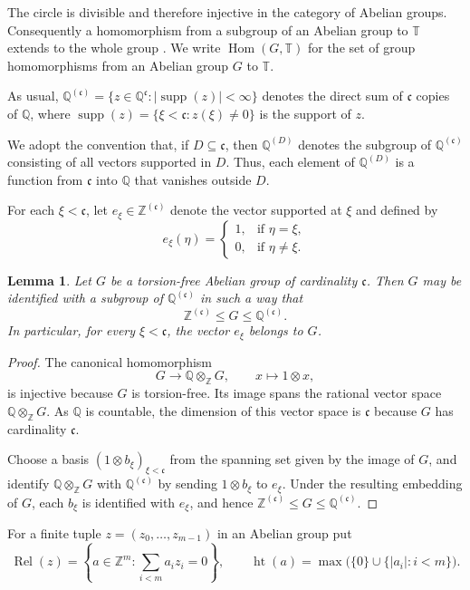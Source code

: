 \documentclass[10pt,a4paper]{amsart}
\newtheorem{lemma}[theorem]{Lemma}
\newcommand{\T}{\mathbb T}
\newcommand{\Z}{\mathbb Z}
\newcommand{\Q}{\mathbb Q}
\newcommand{\cfrak}{\mathfrak c}
\newcommand{\Hom}{\operatorname{Hom}}
\newcommand{\supp}{\operatorname{supp}}
\newcommand{\Rel}{\operatorname{Rel}}
\newcommand{\htop}{\operatorname{ht}}
\begin{document}
The circle is divisible and therefore injective in the category of Abelian
groups.  Consequently a homomorphism from a subgroup of an Abelian group to
$\T$ extends to the whole group
\cite[Theorem~21.1]{Fuchs1970}.
We write $\Hom(G,\T)$ for the set of group homomorphisms from an Abelian
group $G$ to $\T$.

As usual, $\Q^{(\cfrak)}=\{z\in\Q^{\cfrak}:|\supp(z)|<\infty\}$ denotes the
direct sum of $\cfrak$ copies of $\Q$, where
$\supp(z)=\{\xi<\cfrak:z(\xi)\neq0\}$ is the support of $z$.

We adopt the convention that, if $D\subseteq\cfrak$, then $\Q^{(D)}$
denotes the subgroup of $\Q^{(\cfrak)}$ consisting of all vectors supported
in $D$.  Thus, each element of $\Q^{(D)}$ is a function from $\cfrak$ into
$\Q$ that vanishes outside $D$.

For each $\xi<\cfrak$, let $e_\xi\in\Z^{(\cfrak)}$ denote the vector
supported at $\xi$ and defined by
\[
 e_\xi(\eta)=
 \begin{cases}
  1,&\text{if $\eta=\xi$},\\
  0,&\text{if $\eta\neq\xi$}.
 \end{cases}
\]

\begin{lemma}\label{lem:torsion-free-coordinatization}
Let $G$ be a torsion-free Abelian group of cardinality $\cfrak$.  Then $G$ may
be identified with a subgroup of $\Q^{(\cfrak)}$ in such a way that
\[
 \Z^{(\cfrak)}\leq G\leq\Q^{(\cfrak)}.
\]
In particular, for every $\xi<\cfrak$, the vector $e_\xi$ belongs to $G$.
\end{lemma}

\begin{proof}
The canonical homomorphism
\[
 G\longrightarrow\Q\otimes_{\Z}G,
 \qquad x\longmapsto1\otimes x,
\]
is injective because $G$ is torsion-free.  Its image spans the rational vector
space $\Q\otimes_{\Z}G$. As $\mathbb Q$ is countable, the dimension of this vector space is $\cfrak$ because $G$ has cardinality $\cfrak$.

Choose a basis $(1\otimes b_\xi)_{\xi<\cfrak}$ from the spanning set given by
the image of $G$, and identify $\Q\otimes_{\Z}G$ with
$\Q^{(\cfrak)}$ by sending $1\otimes b_\xi$ to $e_\xi$.  Under the resulting
embedding of $G$, each $b_\xi$ is identified with $e_\xi$, and hence
$\Z^{(\cfrak)}\leq G\leq\Q^{(\cfrak)}$.
\end{proof}

For a finite tuple $z=(z_0,\ldots,z_{m-1})$ in an Abelian group put
\[
 \Rel(z)=\left\{a\in\Z^m:\sum_{i<m} a_i z_i=0\right\},
 \qquad
 \htop(a)=\max\bigl(\{0\}\cup\{|a_i|:i<m\}\bigr).
\]
\end{document}
